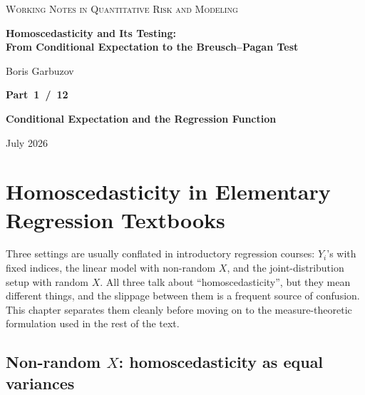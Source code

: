 \documentclass[a4paper,oneside,12pt]{extarticle}
\theoremstyle{plain}
\theoremstyle{definition}
\theoremstyle{remark}
\begin{document}
\begin{titlepage}
\begin{center}

{\footnotesize\scshape\color{gray}
Working Notes in Quantitative Risk and Modeling
}

\vfill

{\LARGE\bfseries Homoscedasticity and Its Testing:\\[4pt]
From Conditional Expectation to the Breusch--Pagan Test}

\vspace{36pt}

{\normalsize Boris Garbuzov}

\vfill

{\Large\bfseries Part~1~/~12}

\vspace{6pt}

{\Large\bfseries Conditional Expectation and the Regression Function}

\vfill

{\small July 2026}

\end{center}
\end{titlepage}

\setcounter{tocdepth}{2}
\tableofcontents
\newpage

\section{Homoscedasticity in Elementary Regression Textbooks}
\label{sec:elementary_textbooks}

Three settings are usually conflated in introductory regression
courses: $Y_i$'s with fixed indices, the linear model with non-random
$X$, and the joint-distribution setup with random $X$.  All three
talk about ``homoscedasticity'', but they mean different things, and
the slippage between them is a frequent source of confusion.  This
chapter separates them cleanly before moving on to the measure-theoretic
formulation used in the rest of the text.

\subsection{Non-random $X$: homoscedasticity as equal variances}
\label{sec:nonrandom}
\end{document}
